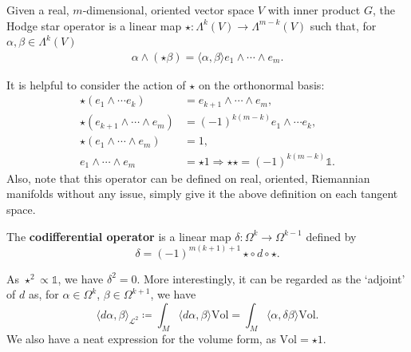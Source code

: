 \documentclass[11pt, final]{article}
\begin{document}
\begin{definition}
	Given a real, $m$-dimensional, oriented vector space $V$ with inner product $G$, the Hodge star operator is a linear map $\star: \Lambda^k(V) \to \Lambda^{m-k}(V)$ such that, for $\alpha, \beta \in \Lambda^k (V)$
		\begin{align}
			\alpha \wedge ( \star \beta ) = \langle \alpha, \beta \rangle e_1 \wedge \cdots \wedge e_m.
		\end{align}
\end{definition}
\begin{remark}
	It is helpful to consider the action of $\star$ on the orthonormal basis:
			\begin{subequations}\begin{align}
				\star( e_1 \wedge \cdots e_k ) &= e_{k+1} \wedge \cdots \wedge e_m, \\
				\star( e_{k+1} \wedge \cdots \wedge e_m ) &= (-1)^{k(m-k)} e_1 \wedge \cdots e_k, \\
				\star( e_1 \wedge \cdots \wedge e_m ) &= 1, \\
				  e_1 \wedge \cdots \wedge e_m &=\star 1 \Rightarrow \star \star = (-1)^{k(m-k)} \mathds{1}.
			\end{align}\end{subequations}
		Also, note that this operator can be defined on real, oriented, Riemannian manifolds without any issue, simply give it the above definition on each tangent space.
\end{remark}

\begin{definition}
	The \textbf{codifferential operator} is a linear map $\delta: \Omega^k \to \Omega^{k-1}$ defined by
		\begin{equation}
			\delta = (-1)^{m(k+1)+1} \star \circ \, d \circ \star.
		\end{equation}
\end{definition}
\begin{remark}
	As $\star^2 \propto \mathds{1}$, we have $\delta^2 = 0$. More interestingly, it can be regarded as the `adjoint' of $d$ as, for $\alpha \in \Omega^k$, $\beta \in \Omega^{k+1}$, we have
		\begin{equation}
			\langle d\alpha, \beta \rangle_{\mathcal{L}^2} \coloneqq \int_M \langle d\alpha, \beta \rangle \mathrm{Vol} = \int_M \langle \alpha, \delta \beta \rangle \mathrm{Vol}.
		\end{equation}
	We also have a neat expression for the volume form, as $\mathrm{Vol} = \star 1$.
\end{remark}
	
\end{document}
